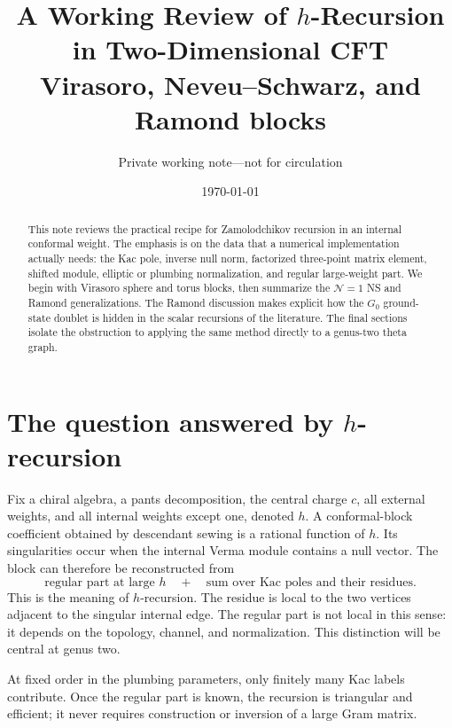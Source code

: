 \documentclass[11pt]{article}
\title{A Working Review of \(h\)-Recursion in Two-Dimensional CFT\\[0.4em]
\large Virasoro, Neveu--Schwarz, and Ramond blocks}
\author{Private working note---not for circulation}
\date{\today}
\begin{document}
\maketitle

\begin{abstract}
This note reviews the practical recipe for Zamolodchikov recursion in an
internal conformal weight.  The emphasis is on the data that a numerical
implementation actually needs: the Kac pole, inverse null norm, factorized
three-point matrix element, shifted module, elliptic or plumbing
normalization, and regular large-weight part.  We begin with Virasoro sphere
and torus blocks, then summarize the \(\mathcal N=1\) NS and Ramond
generalizations.  The Ramond discussion makes explicit how the \(G_0\)
ground-state doublet is hidden in the scalar recursions of the literature.
The final sections isolate the obstruction to applying the same method
directly to a genus-two theta graph.
\end{abstract}

\tableofcontents

\section{\texorpdfstring{The question answered by \(h\)-recursion}
{The question answered by h-recursion}}

Fix a chiral algebra, a pants decomposition, the central charge \(c\), all
external weights, and all internal weights except one, denoted \(h\).
A conformal-block coefficient obtained by descendant sewing is a rational
function of \(h\).  Its singularities occur when the internal Verma module
contains a null vector.  The block can therefore be reconstructed from
\begin{equation}
 \boxed{
 \text{regular part at large \(h\)}
 \quad+\quad
 \text{sum over Kac poles and their residues}.}
 \label{eq:one-line-summary}
\end{equation}
This is the meaning of \(h\)-recursion.  The residue is local to the two
vertices adjacent to the singular internal edge.  The regular part is not
local in this sense: it depends on the topology, channel, and normalization.
This distinction will be central at genus two.

At fixed order in the plumbing parameters, only finitely many Kac labels
contribute.  Once the regular part is known, the recursion is triangular and
efficient; it never requires construction or inversion of a large Gram
matrix.
\end{document}
